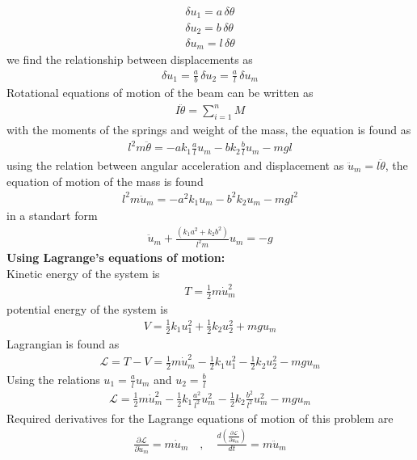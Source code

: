 \documentclass[]{report}
\begin{document}
\begin{eqnarray*}
\delta u_1=a \, \delta \theta \\
\delta u_2=b \, \delta \theta \\
\delta u_m =l \, \delta \theta 
\end{eqnarray*}
we find the relationship between displacements as
\begin{eqnarray*}
\delta u_1 =\frac{a}{b} \, \delta u_2 =\frac{a}{l}\, \delta u_m
\end{eqnarray*}
Rotational equations of motion of the beam can be written as
\begin{eqnarray*}
I \ddot{\theta}=\sum_{i=1}^{n} M
\end{eqnarray*}
with the moments of the springs and weight of the mass, the equation is found as
\begin{eqnarray*}
l^2 m \ddot{\theta}=-a k_1 \frac{a}{l}u_m-b k_2 \frac{b}{l}u_m -mgl
\end{eqnarray*}
using the relation between angular acceleration and displacement as $\ddot{u}_m=l \ddot{\theta}$, the equation of motion of the mass is found
\begin{eqnarray*}
l^2 m \ddot{u}_m =-a ^2 k_1 u_m -b^2 k_2 u_m -mgl^2
\end{eqnarray*}
in a standart form
\begin{eqnarray*}
\ddot{u}_m+\frac{(k_1 a^2 +k_2 b^2)}{l^2 m} u_m =-g
\end{eqnarray*}
\textbf{Using Lagrange's equations of motion:}\\
Kinetic energy of the system is
\begin{eqnarray*}
T=\frac{1}{2} m \dot{u}_m ^2
\end{eqnarray*}
potential energy of the system is
\begin{eqnarray*}
V=\frac{1}{2} k_1 {u}_1 ^2 +\frac{1}{2} k_2 u_2^2+mgu_m
\end{eqnarray*}
Lagrangian is found as
\begin{eqnarray*}
\mathcal{L}=T-V=\frac{1}{2} m \dot{u}_m ^2-\frac{1}{2} k_1 {u}_1 ^2 -\frac{1}{2} k_2 u_2^2-mgu_m
\end{eqnarray*}
Using the relations $u_1=\frac{a}{l} u_m$ and $u_2=\frac{b}{l}$
\begin{eqnarray*}
\mathcal{L}=\frac{1}{2} m \dot{u}_m^2 -\frac{1}{2} k_1 \frac{a^2}{l^2} u_m^2 -\frac{1}{2} k_2 \frac{b^2}{l^2} u_m^2 -mgu_m
\end{eqnarray*}
Required derivatives for the Lagrange equations of motion of this problem are
\begin{eqnarray*}
\frac{\partial \mathcal{L}}{\partial \dot{u}_m}=m \dot{u}_m \quad , \quad \frac{d \left(\frac{\partial \mathcal{L}}{\partial \dot{u}_m}\right)}{dt}=m \ddot{u}_m\\
\end{eqnarray*}
\end{document}
